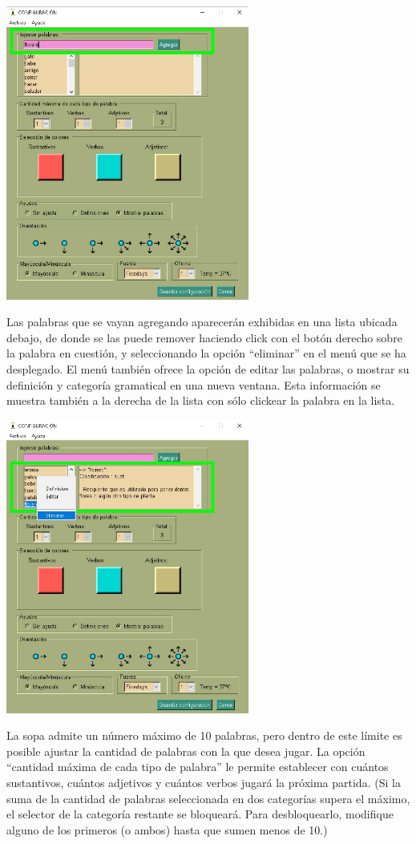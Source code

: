 \includegraphics[width=0.6\textwidth,keepaspectratio]{img/guia/3.jpg}

Las palabras que se vayan agregando aparecerán exhibidas en una lista ubicada debajo, de donde se las puede remover haciendo click con el botón derecho sobre la palabra en cuestión, y seleccionando la opción “eliminar” en el menú que se ha desplegado. El menú también ofrece la opción de editar las palabras, o mostrar su definición y categoría gramatical en una nueva ventana. Esta información se muestra también a la derecha de la lista con sólo clickear la palabra en la lista.

\includegraphics[width=0.6\textwidth,keepaspectratio]{img/guia/5.jpg}

La sopa admite un número máximo de 10 palabras, pero dentro de este límite es posible ajustar la cantidad de palabras con la que desea jugar. La opción “cantidad máxima de cada tipo de palabra” le permite establecer con cuántos sustantivos, cuántos adjetivos y cuántos verbos jugará la próxima partida. (Si la suma de la cantidad de palabras seleccionada en dos categorías supera el máximo, el selector de la categoría restante se bloqueará. Para desbloquearlo, modifique alguno de los primeros (o ambos) hasta que sumen menos de 10.)

